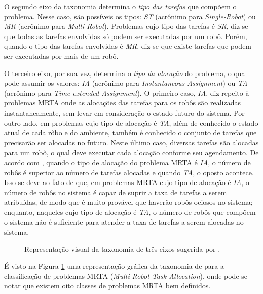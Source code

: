             O segundo eixo da taxonomia determina o \textit{tipo das tarefas} que compõem o problema. Nesse caso, são possíveis os tipos: \textit{ST} (acrônimo para \textit{Single-Robot}) ou \textit{MR} (acrônimo para \textit{Multi-Robot}). Problemas cujo tipo das tarefas é \textit{SR}, diz-se que todas as tarefas envolvidas só podem ser executadas por um robô. Porém, quando o tipo das tarefas envolvidas é \textit{MR}, diz-se que existe tarefas que podem ser executadas por mais de um robô.
            
            O terceiro eixo, por sua vez, determina o \textit{tipo da alocação} do problema, o qual pode assumir os valores: \textit{IA} (acrônimo para \textit{Instantaneous Assignment}) ou \textit{TA} (acrônimo para \textit{Time-extended Assignment}). O primeiro caso, \textit{IA}, diz repeito à problemas MRTA onde as alocações das tarefas para os robôs são realizadas instantaneamente, sem levar em consideração o estado futuro do sistema. Por outro lado, em problemas cujo tipo de alocação é \textit{TA}, além de conhecido o estado atual de cada rôbo e do ambiente, também é conhecido o conjunto de tarefas que precisarão ser alocadas no futuro. Neste último caso, diversas tarefas são alocadas para um robô, o qual deve executar cada alocação conforme seu agendamento. De acordo com , quando o tipo de alocação do problema MRTA é \textit{IA}, o número de robôs é superior ao número de tarefas alocadas e quando \textit{TA}, o oposto acontece. Isso se deve ao fato de que, em problemas MRTA cujo tipo de alocação é \textit{IA}, o número de robôs no sistema é capaz de suprir a taxa de tarefas a serem atribuídas, de modo que é muito provável que haverão robôs ociosos no sistema; enquanto, naqueles cujo tipo de alocação é \textit{TA}, o número de robôs que compõem o sistema não é suficiente para atender a taxa de tarefas a serem alocadas no sistema.
            
            \begin{figure}[htb]
                \centering
                
                \caption[Representação visual da taxonomia de três eixos]{Representação visual da taxonomia de três eixos sugerida por .} \label{fig:taxomia_mrta}
            \end{figure}
            
            É visto na Figura \ref{fig:taxomia_mrta} uma representação gráfica da taxonomia de  para a classificação de problemas MRTA (\textit{Multi-Robot Task Allocation}), onde pode-se notar que existem oito classes de problemas MRTA bem definidos.
            

